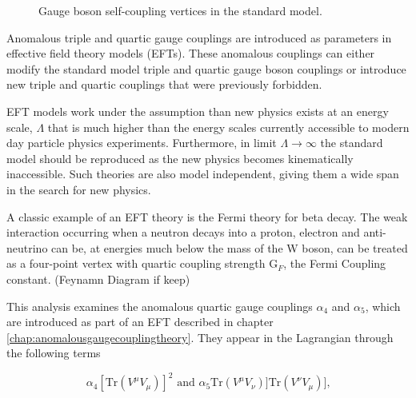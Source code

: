\begin{figure}[h!]
  \caption[Gauge boson self-coupling vertices in the standard model.]{Gauge boson self-coupling vertices in the standard model.}
  \label{fig:smtripleandquarticvertices}
\end{figure}

Anomalous triple and quartic gauge couplings are introduced as parameters in effective field theory models (EFTs).  These anomalous couplings can either modify the standard model triple and quartic gauge boson couplings or introduce new triple and quartic couplings that were previously forbidden.  

EFT models work under the assumption than new physics exists at an energy scale, $\Lambda$ that is much higher than the energy scales currently accessible to modern day particle physics experiments.  Furthermore, in limit $\Lambda \rightarrow \infty$ the standard model should be reproduced as the new physics becomes kinematically inaccessible.  Such theories are also model independent, giving them a wide span in the search for new physics.

A classic example of an EFT theory is the Fermi theory for beta decay.  The weak interaction occurring when a neutron decays into a proton, electron and anti-neutrino can be, at energies much below the mass of the W boson, can be treated as a four-point vertex with quartic coupling strength $\text{G}_{F}$, the Fermi Coupling constant.  (Feynamn Diagram if keep)

This analysis examines the anomalous quartic gauge couplings $\alpha_{4}$ and $\alpha_{5}$, which are introduced as part of an EFT described in chapter \ref{chap:anomalousgaugecouplingtheory}.  They appear in the Lagrangian through the following terms 

\begin{equation}
\alpha_{4}[\text{Tr}(V^{\mu}V_{\mu})]^{2} \text{ and } \alpha_{5}\text{Tr}(V^{\mu}V_{\nu})] \text{Tr}(V^{\nu}V_{\mu})]\text{,}
\end{equation}

